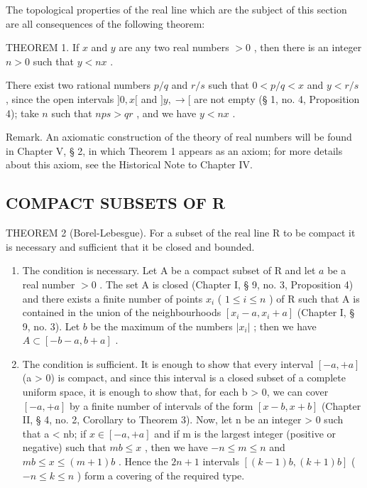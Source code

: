 The topological properties of the real line which are the subject of this section are all consequences of the following theorem:

THEOREM 1. If \(x\) and \(y\) are any two real numbers \(>0\) , then there is an integer \(n > 0\) such that \(y < nx\) .

There exist two rational numbers \(p / q\) and \(r / s\) such that \(0 < p / q < x\) and \(y < r / s\) , since the open intervals \(]0, x[\) and \(]y, \rightarrow[\) are not empty (§ 1, no. 4, Proposition 4); take \(n\) such that \(nps > qr\) , and we have \(y < nx\) .

Remark. An axiomatic construction of the theory of real numbers will be found in Chapter V, § 2, in which Theorem 1 appears as an axiom; for more details about this axiom, see the Historical Note to Chapter IV.

\subsection{COMPACT SUBSETS OF R}

THEOREM 2 (Borel-Lebesgue). For a subset of the real line R to be compact it is necessary and sufficient that it be closed and bounded.

\begin{enumerate}
\def\labelenumi{\arabic{enumi})}
\item
  The condition is necessary. Let A be a compact subset of R and let \(a\) be a real number \(>0\) . The set A is closed (Chapter I, § 9, no. 3, Proposition 4) and there exists a finite number of points \(x_{i}\) ( \(1 \leqslant i \leqslant n\) ) of R such that A is contained in the union of the neighbourhoods \([x_{i} - a, x_{i} + a]\) (Chapter I, § 9, no. 3). Let \(b\) be the maximum of the numbers \(|x_{i}|\) ; then we have \(A \subset [-b - a, b + a]\) .
\item
  The condition is sufficient. It is enough to show that every interval \([-a, +a]\) (a \textgreater{} 0) is compact, and since this interval is a closed subset of a complete uniform space, it is enough to show that, for each b \textgreater{} 0, we can cover \([-a, +a]\) by a finite number of intervals of the form \([x - b, x + b]\) (Chapter II, § 4, no. 2, Corollary to Theorem 3). Now, let n be an integer \textgreater{} 0 such that a \textless{} nb; if \(x \in [-a, +a]\) and if m is the largest integer (positive or negative) such that \(mb \leqslant x\) , then we have \(-n \leqslant m \leqslant n\) and \(mb \leqslant x \leqslant (m + 1)b\) . Hence the \(2n + 1\) intervals \([(k - 1)b, (k + 1)b]\) ( \(-n \leqslant k \leqslant n\) ) form a covering of the required type.
\end{enumerate}

